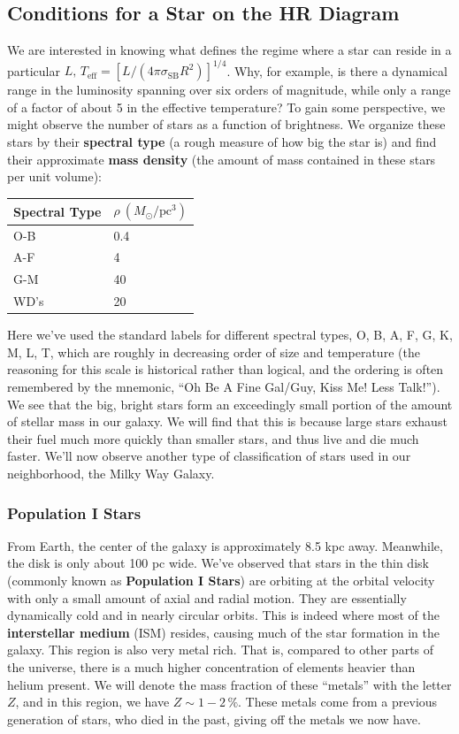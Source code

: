 \documentclass[10pt]{article}
\numberwithin{equation}{section}
\begin{document}
	\subsection{Conditions for a Star on the HR Diagram}
	We are interested in knowing what defines the regime where a star can 
reside in a particular $L,\,T_{\mathrm{eff}}=[L/(4\pi\sigma_{\mathrm{SB}}
R^2)]^{1/4}$. Why, for example, is there a dynamical range in the 
luminosity spanning over six orders of magnitude, while only a range of a 
factor of about 5 in the effective temperature? To gain some perspective, 
we might observe the number of stars as a function of brightness. We 
organize these stars by their \textbf{spectral type} (a rough measure of 
how big the star is) and find their approximate \textbf{mass density} (the 
amount of mass contained in these stars per unit volume):
	\begin{center} 
	\begin{tabular}{l l}
		Spectral Type & $\rho\ (M_\odot/\mathrm{pc^3})$\\
		\hline
		O-B & 0.4\\
		A-F & 4\\
		G-M & 40\\
		WD's & 20
	\end{tabular}
	\end{center}
	Here we've used the standard labels for different spectral types, O, B, 
A, F, G, K, M, L, T, which are roughly in decreasing order of size and 
temperature (the reasoning for this scale is historical rather than 
logical, and the ordering is often remembered by the mnemonic, ``Oh Be A 
Fine Gal/Guy, Kiss Me! Less Talk!''). We see that the big, bright stars 
form an exceedingly small portion of the amount of stellar mass in our 
galaxy. We will find that this is because large stars exhaust their fuel 
much more quickly than smaller stars, and thus live and die much faster. 
We'll now observe another type of classification of stars used in our 
neighborhood, the Milky Way Galaxy.
		
	\subsubsection{Population I Stars}
	From Earth, the center of the galaxy is approximately 8.5 kpc away. 
Meanwhile, the disk is only about 100 pc wide.  We've observed that stars 
in the thin disk (commonly known as \textbf{Population I Stars}) are 
orbiting at the orbital velocity with only a small amount of axial and 
radial motion. They are essentially dynamically cold and in nearly circular 
orbits. This is indeed where most of the \textbf{interstellar medium} (ISM) 
resides, causing much of the star formation in the galaxy. This region is 
also very metal rich. That is, compared to other parts of the universe, 
there is a much higher concentration of elements heavier than helium 
present. We will denote the mass fraction of these ``metals'' with the 
letter $Z$, and in this region, we have $Z\sim 1-2\,\%$. These metals come 
from a previous generation of stars, who died in the past, giving off the 
metals we now have.	
	
\end{document}
